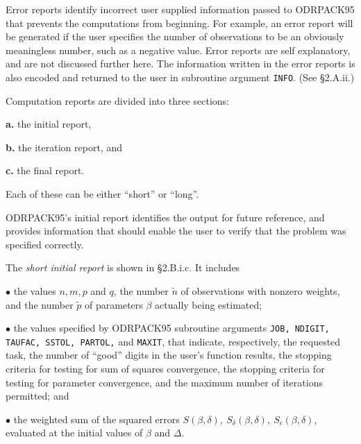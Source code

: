 \bigskip{}
\medskip
\noindent Error reports identify incorrect user supplied information passed to
ODRPACK95 that prevents the computations from beginning. For example, an error report will be generated if the user specifies the number of observations to be an obviously meaningless number, such as a negative value. Error reports are self explanatory, and are not discussed further here. The information written in the error reports is also encoded and returned to the user in subroutine argument {\tt INFO}. (See \S 2.A.ii.)

\bigskip{}
\medskip
\noindent Computation reports are divided into three sections:
\item{\bf a.} the initial report,
\item{\bf b.} the iteration report, and
\item{\bf c.} the final report.

\noindent Each of these can be either ``short'' or ``long''.

\bigskip{}
\medskip
\noindent ODRPACK95's initial report identifies the output for future reference, and provides information that should enable the user to verify that the problem was specified correctly.

\noindent The {\it short initial report} is shown in \S 2.B.i.c. It includes
\item{$\bullet$} the values $n, m, p$ and $q$, the number $\tilde{n}$ of observations with nonzero weights, and the number $\tilde{p}$ of parameters $\beta$ actually being estimated;
\item{$\bullet$} the values specified by ODRPACK95 subroutine arguments {\tt JOB, NDIGIT, TAUFAC, SSTOL, PARTOL,} and {\tt MAXIT}, that indicate, respectively, the requested task, the number of ``good'' digits in the user's function results, the stopping criteria for testing for sum of squares convergence, the stopping criteria for testing for parameter convergence, and the maximum number of iterations permitted; and
\item{$\bullet$} the weighted sum of the squared errors $S(\beta,\delta),\ S_{\delta}(\beta,\delta),\ S_{\epsilon}(\beta,\delta)$, evaluated at the initial values of $\beta$ and $\Delta$.

